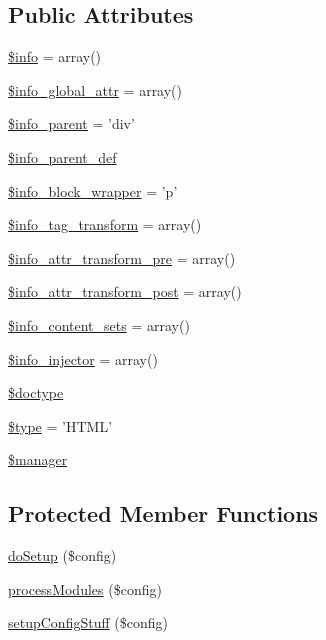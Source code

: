\subsection*{Public Attributes}
\begin{DoxyCompactItemize}
\item 
\hyperlink{classHTMLPurifier__HTMLDefinition_ab4bac9f9178f0afffbf52261d2957f0f}{\$info} = array()
\item 
\hyperlink{classHTMLPurifier__HTMLDefinition_ac0a6b529fd54bf3e94fb4f6ef1555a39}{\$info\+\_\+global\+\_\+attr} = array()
\item 
\hyperlink{classHTMLPurifier__HTMLDefinition_ab32cb20536d9eea061c61c5f895af3b8}{\$info\+\_\+parent} = 'div'
\item 
\hyperlink{classHTMLPurifier__HTMLDefinition_ae715103eaaad56c4d09a9c32db82e022}{\$info\+\_\+parent\+\_\+def}
\item 
\hyperlink{classHTMLPurifier__HTMLDefinition_a5cc22490461d0b4d669370a7c3d65de3}{\$info\+\_\+block\+\_\+wrapper} = 'p'
\item 
\hyperlink{classHTMLPurifier__HTMLDefinition_aef7624e8f0a8dde1e5358ec9bfaefc7c}{\$info\+\_\+tag\+\_\+transform} = array()
\item 
\hyperlink{classHTMLPurifier__HTMLDefinition_a6611f980f1032f5f9ba85c2b2c5eb867}{\$info\+\_\+attr\+\_\+transform\+\_\+pre} = array()
\item 
\hyperlink{classHTMLPurifier__HTMLDefinition_a80c26abf49745da3b4b777610a65b03e}{\$info\+\_\+attr\+\_\+transform\+\_\+post} = array()
\item 
\hyperlink{classHTMLPurifier__HTMLDefinition_a6b30c22edf1203d78746f119ba3292da}{\$info\+\_\+content\+\_\+sets} = array()
\item 
\hyperlink{classHTMLPurifier__HTMLDefinition_a22beaf3dd6ed19e1f850f3c146c7f2d7}{\$info\+\_\+injector} = array()
\item 
\hyperlink{classHTMLPurifier__HTMLDefinition_a438cd686a28b47fe48222f9895044f8c}{\$doctype}
\item 
\hyperlink{classHTMLPurifier__HTMLDefinition_a45e0d16c16636c45f2fbdfa556ec9294}{\$type} = 'H\+T\+M\+L'
\item 
\hyperlink{classHTMLPurifier__HTMLDefinition_a7d12dbd6f3c9e01dc952a86c4b9e09ef}{\$manager}
\end{DoxyCompactItemize}
\subsection*{Protected Member Functions}
\begin{DoxyCompactItemize}
\item 
\hyperlink{classHTMLPurifier__HTMLDefinition_a1dbfe7c9745310137dcc02ef3cb4deb8}{do\+Setup} (\$config)
\item 
\hyperlink{classHTMLPurifier__HTMLDefinition_aa12330b5553a508f8efb3b946c800630}{process\+Modules} (\$config)
\item 
\hyperlink{classHTMLPurifier__HTMLDefinition_a043a82aa9d94a5e40559d5a6a96f0bf8}{setup\+Config\+Stuff} (\$config)
\end{DoxyCompactItemize}


